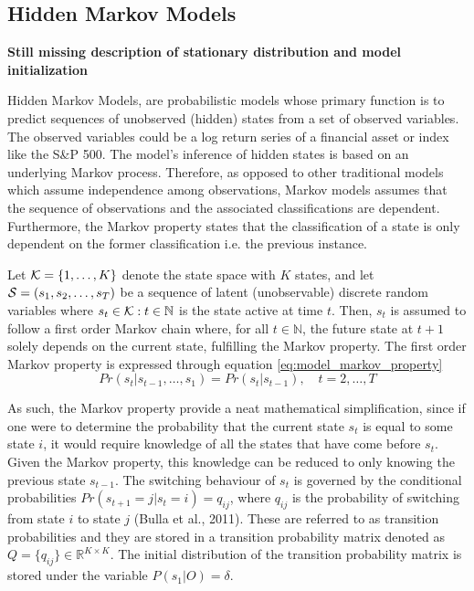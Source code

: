 \subsection{Hidden Markov Models}
\label{subsection: HMM}

\textbf{Still missing description of stationary distribution and model initialization}

Hidden Markov Models, are probabilistic models whose primary function is to predict sequences of unobserved (hidden) states from a set of observed variables. The observed variables could be a log return series of a financial asset or index like the S\&P 500. The model’s inference of hidden states is based on an underlying Markov process. Therefore, as opposed to other traditional models which assume independence among observations, Markov models assumes that the sequence of observations and the associated classifications are dependent. Furthermore, the Markov property states that the classification of a state is only dependent on the former classification i.e. the previous instance. 

Let $\K=\{ 1,\ldots, K \}$ denote the state space with $K$ states, and let $\S=(s_1,s_2,\ldots,s_T)$ be a sequence of latent (unobservable) discrete random variables where $s_t\in\K: t\in \mathbb{N}$ is the state active at time $t$. Then, $s_t$ is assumed to follow a first order Markov chain where, for all $t \in \mathbb{N}$, the future state at $t + 1$ solely depends on the current state, fulfilling the Markov property. The first order Markov property is expressed through equation \ref{eq:model_markov_property}
\begin{equation}
    Pr(s_t | s_{t-1},\ldots,s_1) = Pr(s_t | s_{t-1}),
    \quad t=2,\ldots,T
    \label{eq:model_markov_property}
\end{equation} 

As such, the Markov property provide a neat mathematical simplification, since if one were to determine the probability that the current state $s_t$ is equal to some state $i$, it would require knowledge of all the states that have come before $s_t$. Given the Markov property, this knowledge can be reduced to only knowing the previous state $s_{t-1}$. The switching behaviour of $s_t$ is governed by the conditional probabilities $Pr(s_{t+1} = j| s_t = i) = q_{ij}$, where $q_{ij}$ is the probability of switching from state $i$ to state $j$ (Bulla et al., 2011). These are referred to as transition probabilities and they are stored in a transition probability matrix denoted as $Q = \{q_{ij}\} \in \mathbb{R}^{K \times K}$. The initial distribution of the transition probability matrix is stored under the variable $P(s_1|O)= \delta$.


